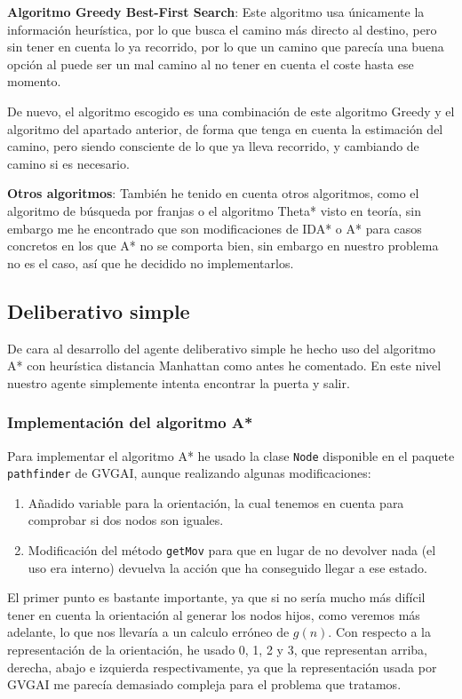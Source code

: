 \documentclass[10pt, spanish]{article}
\begin{document}
\textbf{Algoritmo Greedy Best-First Search}: Este algoritmo usa únicamente la información heurística, por lo que busca el camino más directo al destino, pero sin tener en cuenta lo ya recorrido, por lo que un camino que parecía una buena opción al puede ser un mal camino al no tener en cuenta el coste hasta ese momento.

De nuevo, el algoritmo escogido es una combinación de este algoritmo Greedy y el algoritmo del apartado anterior, de forma que tenga en cuenta la estimación del camino, pero siendo consciente de lo que ya lleva recorrido, y cambiando de camino si es necesario.


\textbf{Otros algoritmos}: También he tenido en cuenta otros algoritmos, como el algoritmo de búsqueda por franjas o el algoritmo Theta* visto en teoría, sin embargo me he encontrado que son modificaciones de IDA* o A* para casos concretos en los que A* no se comporta bien, sin embargo en nuestro problema no es el caso, así que he decidido no implementarlos.

\subsection{Deliberativo simple}

De cara al desarrollo del agente deliberativo simple he hecho uso del algoritmo A* con heurística distancia Manhattan como antes he comentado. En este nivel nuestro agente simplemente intenta encontrar la puerta y salir.

\subsubsection{Implementación del algoritmo A*}

Para implementar el algoritmo A* he usado la clase \texttt{Node} disponible en el paquete \texttt{pathfinder} de GVGAI, aunque realizando algunas modificaciones:

\begin{enumerate}
	\item Añadido variable para la orientación, la cual tenemos en cuenta para comprobar si dos nodos son iguales.
	\item Modificación del método \texttt{getMov} para que en lugar de no devolver nada (el uso era interno) devuelva la acción que ha conseguido llegar a ese estado.
\end{enumerate}

El primer punto es bastante importante, ya que si no sería mucho más difícil tener en cuenta la orientación al generar los nodos hijos, como veremos más adelante, lo que nos llevaría a un calculo erróneo de $g(n)$. Con respecto a la representación de la orientación, he usado 0, 1, 2 y 3, que representan arriba, derecha, abajo e izquierda respectivamente, ya que la representación usada por GVGAI me parecía demasiado compleja para el problema que tratamos.
\end{document}
